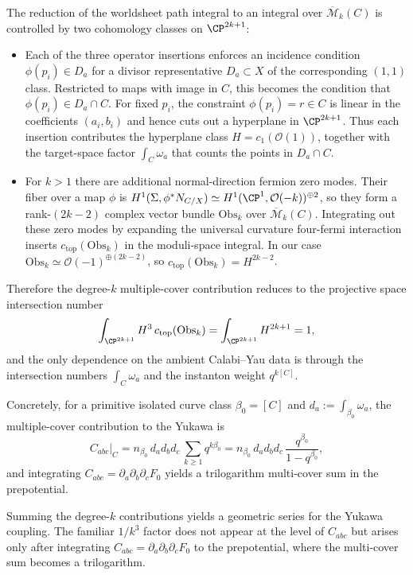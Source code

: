 \documentclass[12pt]{article}
\begin{document}
The reduction of the worldsheet path integral to an integral over
$\overline{\mathcal{M}}_k(C)$ is controlled by two cohomology classes on
$\CP^{2k+1}$:
\begin{itemize}
\item Each of the three operator insertions enforces an incidence condition
  $\phi(p_i)\in D_a$ for a divisor representative $D_a\subset X$ of the
  corresponding $(1,1)$ class. Restricted to maps with image in $C$, this
  becomes the condition that $\phi(p_i)\in D_a\cap C$. For fixed $p_i$, the
  constraint $\phi(p_i)=r\in C$ is linear in the coefficients $(a_i,b_i)$ and
  hence cuts out a hyperplane in $\CP^{2k+1}$. Thus each insertion contributes
  the hyperplane class $H=c_1(\mathcal{O}(1))$, together with the target-space
  factor $\int_C\omega_a$ that counts the points in $D_a\cap C$.
\item For $k>1$ there are additional normal-direction fermion zero modes. Their
  fiber over a map $\phi$ is
  $H^1(\Sigma,\phi^*N_{C/X})\simeq H^1(\CP^1,\mathcal{O}(-k))^{\oplus 2}$, so
  they form a rank-$(2k-2)$ complex vector bundle $\mathrm{Obs}_k$ over
  $\overline{\mathcal{M}}_k(C)$. Integrating out these zero modes by expanding
  the universal curvature four-fermi interaction inserts
  $c_{\mathrm{top}}(\mathrm{Obs}_k)$ in the moduli-space integral. In our case
  $\mathrm{Obs}_k\simeq\mathcal{O}(-1)^{\oplus(2k-2)}$, so
  $c_{\mathrm{top}}(\mathrm{Obs}_k)=H^{2k-2}$.
\end{itemize}
Therefore the degree-$k$ multiple-cover contribution reduces to the projective
space intersection number
\begin{equation*}
  \int_{\CP^{2k+1}} H^3\,c_{\mathrm{top}}(\mathrm{Obs}_k)
  =
  \int_{\CP^{2k+1}} H^{2k+1}
  =1,
\end{equation*}
and the only dependence on the ambient Calabi--Yau data is through the
intersection numbers $\int_C\omega_a$ and the instanton weight $q^{k[C]}$.

Concretely, for a primitive isolated curve class $\beta_0=[C]$ and
$d_a:=\int_{\beta_0}\omega_a$, the multiple-cover contribution to the Yukawa is
\begin{equation*}
  C_{abc}\Big|_{C}
  = n_{\beta_0}\,d_a d_b d_c\,\sum_{k\ge 1} q^{k\beta_0}
  = n_{\beta_0}\,d_a d_b d_c\,\frac{q^{\beta_0}}{1-q^{\beta_0}},
\end{equation*}
and integrating $C_{abc}=\partial_a\partial_b\partial_c F_0$ yields a
trilogarithm multi-cover sum in the prepotential.

Summing the degree-$k$ contributions yields a geometric series for the Yukawa
coupling. The familiar $1/k^3$ factor does not appear at the level of $C_{abc}$
but arises only after integrating $C_{abc}=\partial_a\partial_b\partial_c F_0$
to the prepotential, where the multi-cover sum becomes a trilogarithm.
\end{document}

